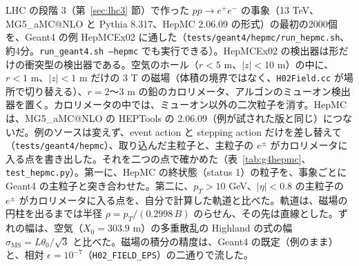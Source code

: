 \documentclass[a4paper,10pt]{ltjsarticle}
\makeatletter
\newcommand{\MGaMC}{MG5\_aMC@NLO}
\makeatother
\begin{document}
LHC の段階 3（第~\ref{sec:lhc3} 節）で作った $pp\to e^+e^-$ の事象（13 TeV、\MGaMC{} と Pythia 8.317、HepMC 2.06.09 の形式）の最初の2000個を、Geant4 の例 HepMCEx02 に通した（\nolinkurl{tests/geant4/hepmc/run_hepmc.sh}、約4分。\texttt{run\_geant4.sh --hepmc} でも実行できる）。HepMCEx02 の検出器は形だけの衝突型の検出器である。空気のホール（$r<5$ m、$|z|<10$ m）の中に、$r<1$ m、$|z|<1$ m だけの 3 T の磁場（体積の境界ではなく、\texttt{H02Field.cc} が場所で切り替える）、$r=2$〜3 m の鉛のカロリメータ、アルゴンのミューオン検出器を置く。カロリメータの中では、ミューオン以外の二次粒子を消す。HepMC は、\MGaMC{} の HEPTools の 2.06.09（例が試された版と同じ）につないだ。例のソースは変えず、event action と stepping action だけを差し替えて（\nolinkurl{tests/geant4/hepmc}）、取り込んだ主粒子と、主粒子の $e^\pm$ がカロリメータに入る点を書き出した。それを二つの点で確かめた（表~\ref{tab:g4hepmc}、\texttt{test\_hepmc.py}）。第一に、HepMC の終状態（status 1）の粒子を、事象ごとに Geant4 の主粒子と突き合わせた。第二に、$p_T>10$ GeV、$|\eta|<0.8$ の主粒子の $e^\pm$ がカロリメータに入る点を、自分で計算した軌道と比べた。軌道は、磁場の円柱を出るまでは半径 $\rho=p_T/(0.2998\,B)$ のらせん、その先は直線とした。ずれの幅は、空気（$X_0=303.9$ m）の多重散乱の Highland の式の幅 $\sigma_{\mathrm{MS}}=L\theta_0/\sqrt3$ と比べた。磁場の積分の精度は、Geant4 の既定（例のまま）と、相対 $\epsilon=10^{-7}$（\texttt{H02\_FIELD\_EPS}）の二通りで流した。
\end{document}
